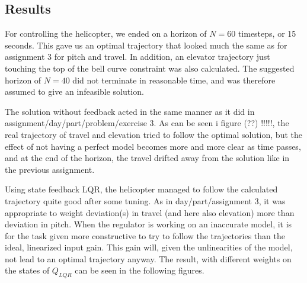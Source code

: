 \subsection{Results}

For controlling the helicopter, we ended on a horizon of $N=60$ timesteps, or 15 seconds. This gave us an optimal trajectory that looked much the same as for assignment 3 for pitch and travel. In addition, an elevator trajectory just touching the top of the bell curve constraint was also calculated. The suggested horizon of $N=40$ did not terminate in reasonable time, and was therefore assumed to give an infeasible solution.%

The solution without feedback acted in the same manner as it did in
assignment/day/part/problem/exercise 3.
As can be seen i figure (??) !!!!!, the real trajectory of travel and elevation tried to follow the optimal solution, but the effect of not having a perfect model becomes more and more clear as time passes, and at the end of the horizon, the travel drifted away from the solution like in the previous assignment.

Using state feedback LQR, the helicopter managed to follow the calculated trajectory quite good after some tuning. As in
day/part/assignment 3,
it was appropriate to weight deviation(s) in travel (and here also elevation) more than deviation in pitch. When the regulator is working on an inaccurate model, it is for the task given more constructive to try to follow the trajectories than the ideal, linearized input gain. This gain will, given the unlinearities of the model, not lead to an optimal trajectory anyway. The result, with different weights on the states of $Q_{LQR}$ can be seen in the following figures. %

